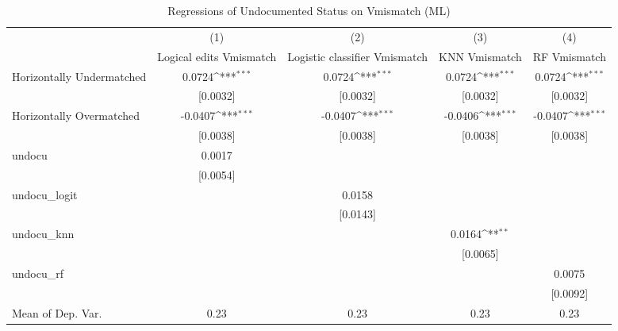 \begin{table}[htbp]\centering
\def\sym#1{\ifmmode^{#1}\else\(^{#1}\)\fi}
\caption{Regressions of Undocumented Status on Vmismatch (ML)}
\begin{tabular}{l*{4}{c}}
\toprule
                    &\multicolumn{1}{c}{(1)}         &\multicolumn{1}{c}{(2)}         &\multicolumn{1}{c}{(3)}         &\multicolumn{1}{c}{(4)}         \\
                    &Logical edits Vmismatch         &Logistic classifier Vmismatch         &KNN Vmismatch         &RF Vmismatch         \\
\midrule
Horizontally Undermatched&      0.0724\sym{***}&      0.0724\sym{***}&      0.0724\sym{***}&      0.0724\sym{***}\\
                    &    [0.0032]         &    [0.0032]         &    [0.0032]         &    [0.0032]         \\
\addlinespace
Horizontally Overmatched&     -0.0407\sym{***}&     -0.0407\sym{***}&     -0.0406\sym{***}&     -0.0407\sym{***}\\
                    &    [0.0038]         &    [0.0038]         &    [0.0038]         &    [0.0038]         \\
\addlinespace
undocu              &      0.0017         &                     &                     &                     \\
                    &    [0.0054]         &                     &                     &                     \\
\addlinespace
undocu\_logit        &                     &      0.0158         &                     &                     \\
                    &                     &    [0.0143]         &                     &                     \\
\addlinespace
undocu\_knn          &                     &                     &      0.0164\sym{**} &                     \\
                    &                     &                     &    [0.0065]         &                     \\
\addlinespace
undocu\_rf           &                     &                     &                     &      0.0075         \\
                    &                     &                     &                     &    [0.0092]         \\
\midrule
Mean of Dep. Var.   &        0.23         &        0.23         &        0.23         &        0.23         \\

\end{tabular}
\end{table}
